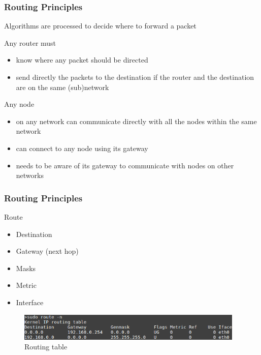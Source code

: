   \begin{frame}
    \frametitle{Routing Principles}
    Algorithms are processed to decide where to forward a packet
	\begin{block}{Any router must}
	  \begin{itemize}
	    \item know where any packet should be directed
	    \item send directly the packets to the destination if the router and the destination are on the same (sub)network
	  \end{itemize}
        \end{block}
	\begin{block}{Any node}
	  \begin{itemize}
	    \item on any network can communicate directly with all the nodes within the same network
	    \item can connect to any node using its gateway
	    \item needs to be aware of its gateway to communicate with nodes on other networks
	  \end{itemize}
        \end{block}
  \end{frame}

  \begin{frame}
    \frametitle{Routing Principles}
	\begin{block}{Route}
	  \begin{itemize}
	    \item Destination
	    \item Gateway (next hop)
	    \item Masks
	    \item Metric
	    \item Interface
	  \end{itemize}
        \end{block}

	\begin{figure}[t]
          \centering
          \includegraphics[height=1.3cm]{./imgs/routing-table.png}
          \caption{Routing table}
          \label{fig:routing_table}
        \end{figure}
  \end{frame}

